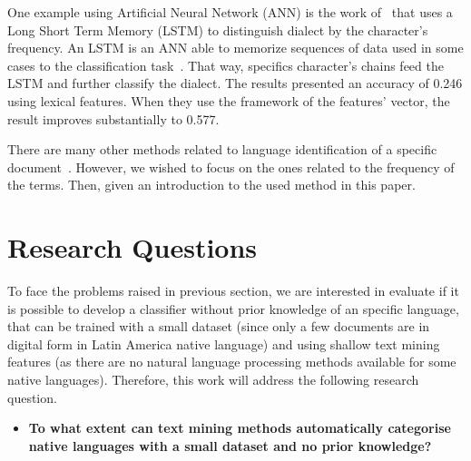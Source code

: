 \documentclass[runningheads]{llncs}
\begin{document}
    One example using Artificial Neural Network (ANN) is the work of~\cite{kp2019deep} that uses a Long Short Term Memory (LSTM) to distinguish dialect by the character's frequency. An LSTM is an ANN able to memorize sequences of data used in some cases to the classification task~\cite{ghosh2016contextual}. That way, specifics character's chains feed the LSTM and further classify the dialect. The results presented an accuracy of 0.246 using lexical features. When they use the framework of the features' vector, the result improves substantially to 0.577.

    There are many other methods related to language identification of a specific document~\cite{jauhiainen2019automatic}. However, we wished to focus on the ones related to the frequency of the terms. Then, given an introduction to the used method in this paper.


    \section{Research Questions}

    To face the problems raised in previous section, we are interested in evaluate if it is possible to develop a classifier without prior knowledge of an specific language, that can be trained with a small dataset (since only a few documents are in digital form in Latin America native language) and using shallow text mining features (as there are no natural language processing methods available for some native languages). Therefore, this work will address the following research question.

    \begin{itemize}


        \item \textbf{To what extent can text mining methods automatically categorise native languages with a small dataset and no prior knowledge?}




    \end{itemize}
\end{document}
